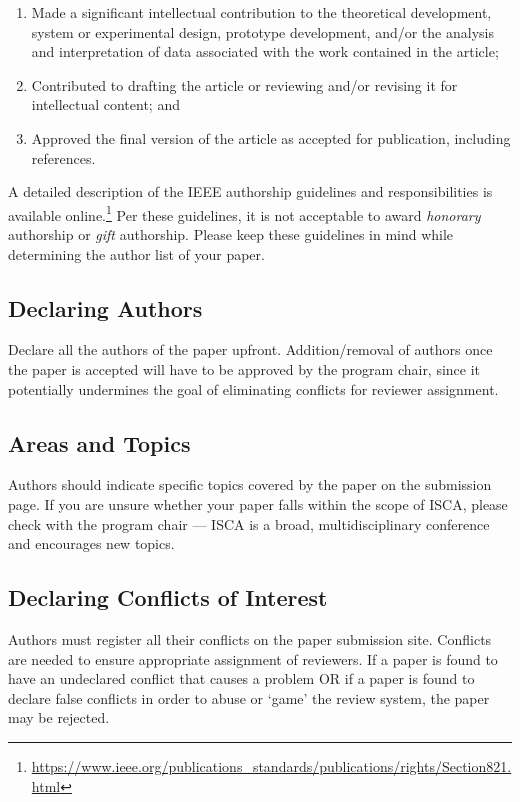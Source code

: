 \documentclass[conference]{IEEEtran}
\begin{document}
\begin{enumerate}
\item Made a significant intellectual contribution to the theoretical
  development, system or experimental design, prototype development,
  and/or the analysis and interpretation of data associated with the
  work contained in the article;

\item Contributed to drafting the article or reviewing and/or revising
  it for intellectual content; and

\item Approved the final version of the article as accepted for publication, including references.
\end{enumerate}

A detailed description of the IEEE authorship guidelines and
responsibilities is available online.\footnote{\url{https://www.ieee.org/publications_standards/publications/rights/Section821.html}} Per
these guidelines, it is not acceptable to award {\em honorary}
authorship or {\em gift} authorship. Please keep these guidelines in
mind while determining the author list of your paper.

\subsection{Declaring Authors}
Declare all the authors of the paper upfront. Addition/removal of
authors once the paper is accepted will have to be approved by the
program chair, since it potentially undermines the goal of eliminating
conflicts for reviewer assignment.

\subsection{Areas and Topics}
Authors should indicate specific topics covered by the paper on the
submission page. If you are unsure whether your paper falls within the
scope of ISCA, please check with the program chair --- ISCA is a broad,
multidisciplinary conference and encourages new topics.

\subsection{Declaring Conflicts of Interest}

Authors must register all their conflicts on the paper submission
site. Conflicts are needed to ensure appropriate assignment of
reviewers. If a paper is found to have an undeclared conflict that
causes a problem OR if a paper is found to declare false conflicts in
order to abuse or `game' the review system, the paper may be rejected.
\end{document}

